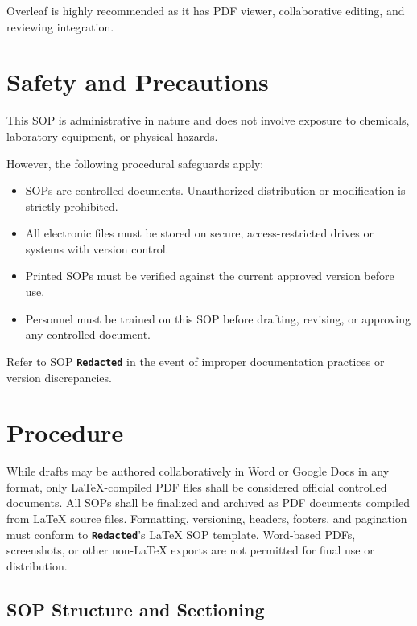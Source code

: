 \documentclass[11pt]{article}
\newcommand{\CompanyName}{\textbf{\texttt{Redacted}}}
\begin{document}
Overleaf is highly recommended as it has PDF viewer, collaborative editing, and reviewing integration.

\section{Safety and Precautions}
    This SOP is administrative in nature and does not involve exposure to chemicals, laboratory equipment, or physical hazards.
    
    However, the following procedural safeguards apply:
    
    \begin{itemize}
        \item SOPs are controlled documents. Unauthorized distribution or modification is strictly prohibited.
        \item All electronic files must be stored on secure, access-restricted drives or systems with version control.
        \item Printed SOPs must be verified against the current approved version before use.
        \item Personnel must be trained on this SOP before drafting, revising, or approving any controlled document.
    \end{itemize}
    
    Refer to SOP {\textbf{\texttt{Redacted}}} in the event of improper documentation practices or version discrepancies.

\section{Procedure}
     While drafts may be authored collaboratively in Word or Google Docs in any format, only LaTeX-compiled PDF files shall be considered official controlled documents. All SOPs shall be finalized and archived as PDF documents compiled from LaTeX source files. Formatting, versioning, headers, footers, and pagination must conform to \CompanyName's LaTeX SOP template. Word-based PDFs, screenshots, or other non-LaTeX exports are not permitted for final use or distribution.

\subsection{SOP Structure and Sectioning}
\end{document}
